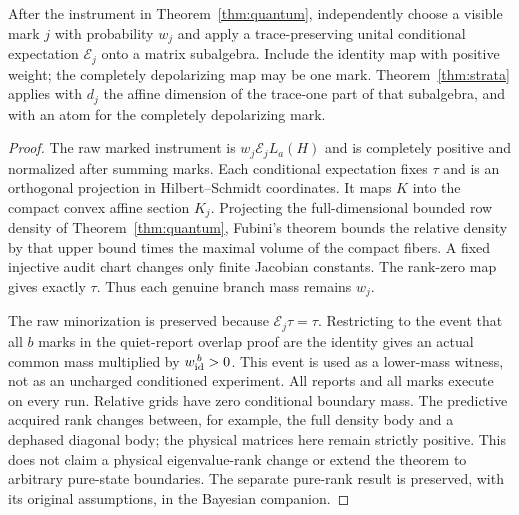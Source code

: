 \begin{corollary}\label{cor:rank}
After the instrument in Theorem~\ref{thm:quantum}, independently choose a visible mark $j$ with probability $w_j$ and apply a trace-preserving unital conditional expectation $\mathcal E_j$ onto a matrix subalgebra. Include the identity map with positive weight; the completely depolarizing map may be one mark. Theorem~\ref{thm:strata} applies with $d_j$ the affine dimension of the trace-one part of that subalgebra, and with an atom for the completely depolarizing mark.
\end{corollary}
\begin{proof}
The raw marked instrument is $w_j\mathcal E_jL_a(H)$ and is completely positive and normalized after summing marks. Each conditional expectation fixes $\tau$ and is an orthogonal projection in Hilbert--Schmidt coordinates. It maps $K$ into the compact convex affine section $K_j$. Projecting the full-dimensional bounded row density of Theorem~\ref{thm:quantum}, Fubini's theorem bounds the relative density by that upper bound times the maximal volume of the compact fibers. A fixed injective audit chart changes only finite Jacobian constants. The rank-zero map gives exactly $\tau$. Thus each genuine branch mass remains $w_j$.

The raw minorization is preserved because $\mathcal E_j\tau=\tau$. Restricting to the event that all $b$ marks in the quiet-report overlap proof are the identity gives an actual common mass multiplied by $w_{\rm id}^{\,b}>0$. This event is used as a lower-mass witness, not as an uncharged conditioned experiment. All reports and all marks execute on every run. Relative grids have zero conditional boundary mass. The predictive acquired rank changes between, for example, the full density body and a dephased diagonal body; the physical matrices here remain strictly positive. This does not claim a physical eigenvalue-rank change or extend the theorem to arbitrary pure-state boundaries. The separate pure-rank result is preserved, with its original assumptions, in the Bayesian companion.
\end{proof}
